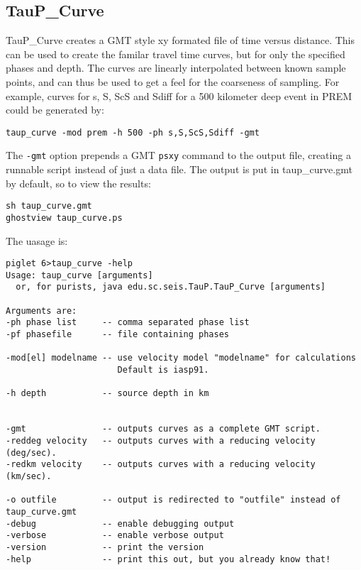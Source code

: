 \subsection{TauP\_Curve}
TauP\_Curve creates a GMT style xy formated file of time versus distance. 
This can be used to create the familar travel time curves, but for
only the specified phases and depth. The curves are linearly interpolated 
between known sample points, and can thus be used to get a feel for the 
coarseness of sampling. For example, curves for s, S, ScS and Sdiff
for a 500 kilometer deep event in PREM could be generated by:

\texttt{taup\_curve -mod prem -h 500 -ph s,S,ScS,Sdiff -gmt}

The \texttt{-gmt} option prepends a GMT \texttt{psxy} command to the output 
file, creating a runnable script instead of just a data file. 
The output is put in taup\_curve.gmt by default, so to view the results:

\begin{verbatim}
sh taup_curve.gmt
ghostview taup_curve.ps
\end{verbatim}

The uasage is:
\begin{verbatim}
piglet 6>taup_curve -help
Usage: taup_curve [arguments]
  or, for purists, java edu.sc.seis.TauP.TauP_Curve [arguments]

Arguments are:
-ph phase list     -- comma separated phase list
-pf phasefile      -- file containing phases

-mod[el] modelname -- use velocity model "modelname" for calculations
                      Default is iasp91.

-h depth           -- source depth in km


-gmt               -- outputs curves as a complete GMT script.
-reddeg velocity   -- outputs curves with a reducing velocity (deg/sec).
-redkm velocity    -- outputs curves with a reducing velocity (km/sec).

-o outfile         -- output is redirected to "outfile" instead of taup_curve.gmt
-debug             -- enable debugging output
-verbose           -- enable verbose output
-version           -- print the version
-help              -- print this out, but you already know that!
\end{verbatim} 
 
